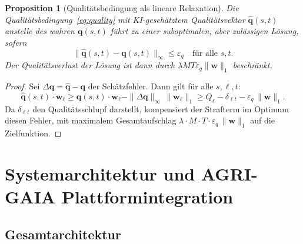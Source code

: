 \documentclass[a4paper, 12pt, twoside, openright]{report}
\newtheorem{proposition}[theorem]{Proposition}
\theoremstyle{definition}
\theoremstyle{definition}
\begin{document}
\begin{proposition}[Qualitätsbedingung als lineare Relaxation]
	Die Qualitätsbedingung~\eqref{eq:quality} mit KI-geschätztem
	Qualitätsvektor $\hat{\mathbf{q}}(s,t)$ anstelle des wahren
	$\mathbf{q}(s,t)$ führt zu einer suboptimalen, aber zulässigen Lösung,
	sofern
	\[
	\bigl\|\hat{\mathbf{q}}(s,t) - \mathbf{q}(s,t)\bigr\|_\infty
	\leq \varepsilon_q \quad\text{für alle } s, t.
	\]
	Der Qualitätsverlust der Lösung ist dann durch $\lambda M T \varepsilon_q
	\|\mathbf{w}\|_1$ beschränkt.
\end{proposition}

\begin{proof}
	Sei $\Delta\mathbf{q} = \hat{\mathbf{q}} - \mathbf{q}$ der
	Schätzfehler. Dann gilt für alle $s, \ell, t$:
	\[
	\hat{\mathbf{q}}(s,t)\cdot\mathbf{w}_\ell \geq
	\mathbf{q}(s,t)\cdot\mathbf{w}_\ell -
	\|\Delta\mathbf{q}\|_\infty\,\|\mathbf{w}_\ell\|_1
	\geq Q_\ell - \delta_{\ell t} - \varepsilon_q\,\|\mathbf{w}\|_1.
	\]
	Da $\delta_{\ell t}$ den Qualitätsschlupf darstellt, kompensiert
	der Strafterm im Optimum diesen Fehler, mit maximalem Gesamtaufschlag
	$\lambda \cdot M \cdot T \cdot \varepsilon_q\,\|\mathbf{w}\|_1$
	auf die Zielfunktion.
\end{proof}


\section{Systemarchitektur und AGRI-GAIA Plattformintegration}


\subsection{Gesamtarchitektur}
\end{document}
